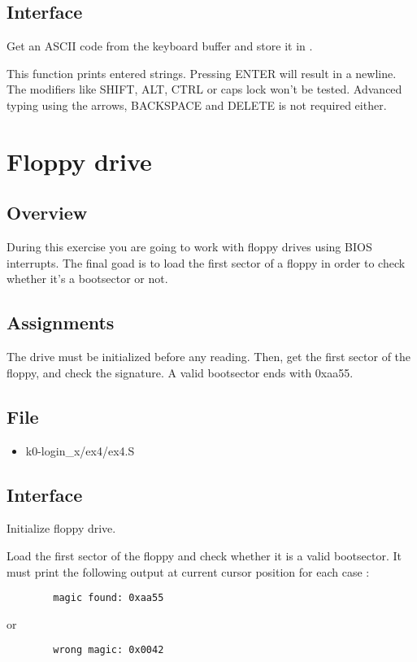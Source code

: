 \subsection*{Interface}
{
  Get an ASCII code from the keyboard buffer and store it in .
}

{
  This function prints entered strings. Pressing ENTER will result in a
  newline.
  The modifiers like SHIFT, ALT, CTRL or caps lock won't be tested. Advanced
  typing using the arrows, BACKSPACE and DELETE is not required either.
}

%
%

\newpage

\section{Floppy drive}

\subsection*{Overview}
During this exercise you are going to work with floppy drives using BIOS
interrupts. The final goad is to load the first sector of a floppy in order
to check whether it's a bootsector or not.

\subsection*{Assignments}
The drive must be initialized before any reading. Then, get the first sector of
the floppy, and check the signature. A valid bootsector ends with 0xaa55.

\subsection*{File}
\begin{itemize}
  \item k0-login\_x/ex4/ex4.S
\end{itemize}

\subsection*{Interface}
{
  Initialize floppy drive.
}

{
  Load the first sector of the floppy and check whether it is a valid
  bootsector. It must print the following output at current cursor
  position for each case :
}
\begin{verbatim}
        magic found: 0xaa55
\end{verbatim}
\function{}{} {
or
}
\begin{verbatim}
        wrong magic: 0x0042
\end{verbatim}


